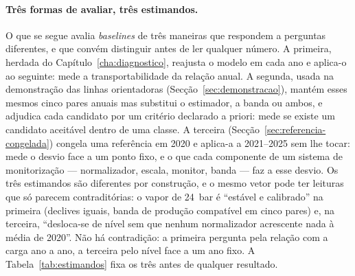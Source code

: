 \paragraph{Três formas de avaliar, três estimandos.} O que se segue avalia
\emph{baselines} de três maneiras que respondem a perguntas diferentes, e
que convém distinguir antes de ler qualquer número. A primeira, herdada do
Capítulo~\ref{cha:diagnostico}, reajusta o modelo em cada ano e aplica-o ao
seguinte: mede a transportabilidade da relação anual. A segunda, usada na
demonstração das linhas orientadoras (Secção~\ref{sec:demonstracao}),
mantém esses mesmos cinco pares anuais mas substitui o estimador, a banda ou
ambos, e adjudica cada candidato por um critério declarado a priori: mede se
existe um candidato aceitável dentro de uma classe. A terceira
(Secção~\ref{sec:referencia-congelada}) congela uma referência em 2020 e
aplica-a a 2021--2025 sem lhe tocar: mede o desvio face a um ponto fixo, e o
que cada componente de um sistema de monitorização --- normalizador,
escala, monitor, banda --- faz a esse desvio. Os três estimandos são
diferentes por construção, e o mesmo vetor pode ter leituras que só parecem
contraditórias: o vapor de 24~bar é ``estável e calibrado'' na primeira
(declives iguais, banda de produção compatível em cinco pares) e, na
terceira, ``desloca-se de nível sem que nenhum normalizador acrescente nada
à média de 2020''. Não há contradição: a primeira pergunta pela relação com
a carga ano a ano, a terceira pelo nível face a um ano fixo. A
Tabela~\ref{tab:estimandos} fixa os três antes de qualquer resultado.


